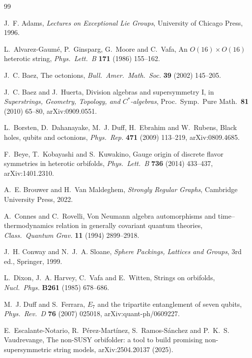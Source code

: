 \begin{thebibliography}{99}
\small

 J.~F. Adams, \emph{Lectures on Exceptional Lie Groups}, University of
Chicago Press, 1996.

 L.~Alvarez-Gaum\'e, P.~Ginsparg, G.~Moore and C.~Vafa, An $O(16)\times O(16)$ heterotic
string, \emph{Phys.\ Lett.\ B} \textbf{171} (1986) 155--162.

 J.~C. Baez, The octonions, \emph{Bull.\ Amer.\ Math.\ Soc.} \textbf{39}
(2002) 145--205.

 J.~C. Baez and J.~Huerta, Division algebras and supersymmetry I, in
\emph{Superstrings, Geometry, Topology, and $C^*$-algebras}, Proc.\ Symp.\ Pure Math.\
\textbf{81} (2010) 65--80, arXiv:0909.0551.

 L.~Borsten, D.~Dahanayake, M.~J. Duff, H.~Ebrahim and W.~Rubens, Black
holes, qubits and octonions, \emph{Phys.\ Rep.} \textbf{471} (2009) 113--219,
arXiv:0809.4685.

 F.~Beye, T.~Kobayashi and S.~Kuwakino, Gauge origin of discrete flavor
symmetries in heterotic orbifolds, \emph{Phys.\ Lett.\ B} \textbf{736} (2014) 433--437, arXiv:1401.2310.

 A.~E. Brouwer and H.~Van Maldeghem, \emph{Strongly Regular Graphs},
Cambridge University Press, 2022.

 A.~Connes and C.~Rovelli, Von Neumann algebra automorphisms and
time--thermodynamics relation in generally covariant quantum theories, \emph{Class.\
Quantum Grav.} \textbf{11} (1994) 2899--2918.

 J.~H. Conway and N.~J.~A. Sloane, \emph{Sphere Packings, Lattices and
Groups}, 3rd ed., Springer, 1999.

 L.~Dixon, J.~A. Harvey, C.~Vafa and E.~Witten, Strings on orbifolds,
\emph{Nucl.\ Phys.} \textbf{B261} (1985) 678--686.

 M.~J. Duff and S.~Ferrara, $E_7$ and the tripartite entanglement of
seven qubits, \emph{Phys.\ Rev.\ D} \textbf{76} (2007) 025018, arXiv:quant-ph/0609227.

\bibitem{EscalanteNotario2025} E.~Escalante-Notario, R.~P\'erez-Mart\'inez, S.~Ramos-S\'anchez and
P.~K.~S. Vaudrevange, The non-SUSY orbifolder: a tool to build promising non-supersymmetric string models,
arXiv:2504.20137 (2025).


\end{thebibliography}

